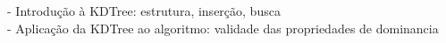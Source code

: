 - Introdução à KDTree: estrutura, inserção, busca \\
- Aplicação da KDTree ao algoritmo: validade das propriedades de dominancia \\
